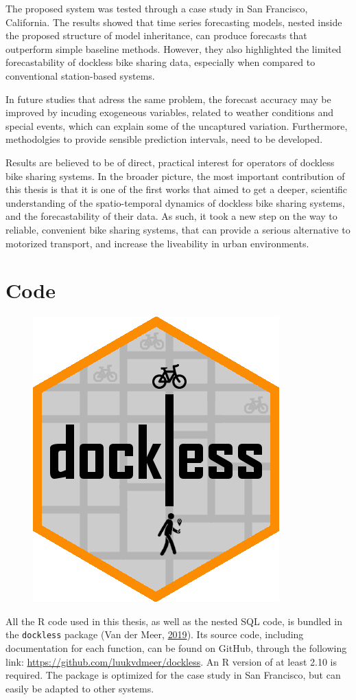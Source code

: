 \documentclass[12pt,oneside]{reedthesis}
\begin{document}
The proposed system was tested through a case study in San Francisco,
California. The results showed that time series forecasting models,
nested inside the proposed structure of model inheritance, can produce
forecasts that outperform simple baseline methods. However, they also
highlighted the limited forecastability of dockless bike sharing data,
especially when compared to conventional station-based systems.

In future studies that adress the same problem, the forecast accuracy
may be improved by incuding exogeneous variables, related to weather
conditions and special events, which can explain some of the uncaptured
variation. Furthermore, methodolgies to provide sensible prediction
intervals, need to be developed.

Results are believed to be of direct, practical interest for operators
of dockless bike sharing systems. In the broader picture, the most
important contribution of this thesis is that it is one of the first
works that aimed to get a deeper, scientific understanding of the
spatio-temporal dynamics of dockless bike sharing systems, and the
forecastability of their data. As such, it took a new step on the way to
reliable, convenient bike sharing systems, that can provide a serious
alternative to motorized transport, and increase the liveability in
urban environments.

\appendix

\chapter{Code}\label{code}
\begin{figure}  
 \begin{center}
    \includegraphics[width=.3\textwidth]{Figures/hexagon.png}  
\end{center}
\end{figure}
All the R code used in this thesis, as well as the nested SQL code, is
bundled in the \texttt{dockless} package (Van der Meer,
\protect\hyperlink{ref-dockless}{2019}). Its source code, including
documentation for each function, can be found on GitHub, through the
following link: \url{https://github.com/luukvdmeer/dockless}. An R
version of at least 2.10 is required. The package is optimized for the
case study in San Francisco, but can easily be adapted to other systems.
\end{document}
